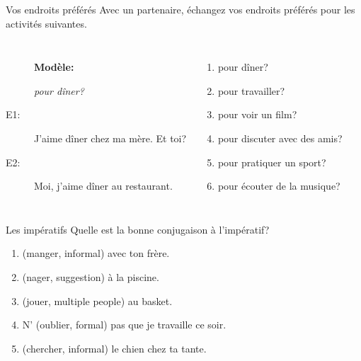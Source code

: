 \documentclass{beamer}
\begin{document}
  \begin{frame}{Vos endroits préférés}
    Avec un partenaire, échangez vos endroits préférés pour les activités suivantes. \\
    \begin{columns}
        \begin{description}
          \item[] \textbf{Modèle:}
          \item[] \emph{pour dîner?}
          \item[E1:] J'aime dîner chez ma mère. Et toi?
          \item[E2:] Moi, j'aime dîner au restaurant.
        \end{description}
        \begin{enumerate}
          \item pour dîner?
          \item pour travailler?
          \item pour voir un film?
          \item pour discuter avec des amis?
          \item pour pratiquer un sport?
          \item pour écouter de la musique?
        \end{enumerate}
    \end{columns}
  \end{frame}

  \begin{frame}{Les impératifs}
    Quelle est la bonne conjugaison à l'impératif? \\
    \begin{enumerate}
      \item \underline{} (manger, informal) avec ton frère.
      \item \underline{} (nager, suggestion) à la piscine.
      \item \underline{} (jouer, multiple people) au basket.
      \item N'\underline{} (oublier, formal) pas que je travaille ce soir.
      \item \underline{} (chercher, informal) le chien chez ta tante.
    \end{enumerate}
  \end{frame}
\end{document}
